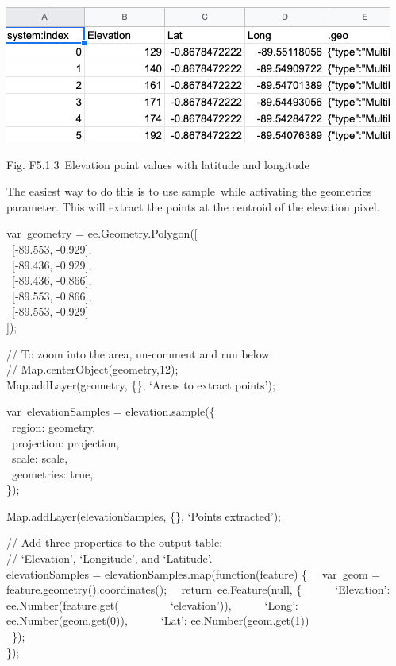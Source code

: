 \documentclass[
  letterpaper,
  DIV=11,
  numbers=noendperiod]{scrreprt}
\begin{document}
\includegraphics{./F5/image11.png}

Fig. F5.1.3~Elevation point values with latitude and longitude

The easiest way to do this is to use sample~while activating the
geometries parameter. This will extract the points at the centroid of
the elevation pixel.

var~geometry = ee.Geometry.Polygon({[}\\
\hspace*{0.333em} ~{[}-89.553, -0.929{]},\\
\hspace*{0.333em} ~{[}-89.436, -0.929{]},\\
\hspace*{0.333em} ~{[}-89.436, -0.866{]},\\
\hspace*{0.333em} ~{[}-89.553, -0.866{]},\\
\hspace*{0.333em} ~{[}-89.553, -0.929{]}\\
{]});

// To zoom into the area, un-comment and run below\\
// Map.centerObject(geometry,12);\\
Map.addLayer(geometry, \{\}, `Areas to extract points');

var~elevationSamples = elevation.sample(\{\\
\hspace*{0.333em} ~region: geometry,\\
\hspace*{0.333em} ~projection: projection,\\
\hspace*{0.333em} ~scale: scale,\\
\hspace*{0.333em} ~geometries: true,\\
\});

Map.addLayer(elevationSamples, \{\}, `Points extracted');

// Add three properties to the output table:\\
// `Elevation', `Longitude', and `Latitude'.\\
elevationSamples = elevationSamples.map(function(feature) \{~ ~var~geom
= feature.geometry().coordinates();~ ~return~ee.Feature(null, \{~ ~ ~
~`Elevation': ee.Number(feature.get(~ ~ ~ ~ ~ ~`elevation')),~ ~ ~
~`Long': ee.Number(geom.get(0)),~ ~ ~ ~`Lat': ee.Number(geom.get(1))\\
\hspace*{0.333em} ~\});\\
\});
\end{document}
